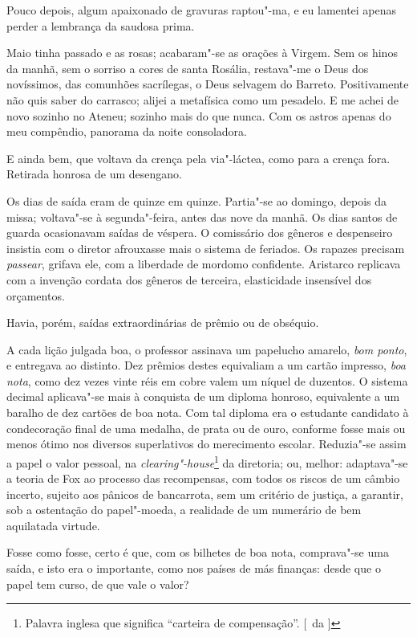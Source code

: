 Pouco depois, algum apaixonado de gravuras raptou"-ma, e eu lamentei
apenas perder a lembrança da saudosa prima. 

Maio tinha passado e as
rosas; acabaram"-se as orações à Virgem. Sem os hinos da manhã, sem o
sorriso a cores de santa Rosália, restava"-me o Deus dos novíssimos,
das comunhões sacrílegas, o Deus selvagem do Barreto. Positivamente não
quis saber do carrasco; alijei a metafísica como um pesadelo. E me
achei de novo sozinho no Ateneu; sozinho mais do que nunca. Com os
astros apenas do meu compêndio, panorama da noite consoladora. 

E ainda bem, que voltava da crença pela via"-láctea, como para a crença fora.
Retirada honrosa de um desengano. 

Os dias de saída eram de quinze em
quinze. Partia"-se ao domingo, depois da missa; voltava"-se à
segunda"-feira, antes das nove da manhã. Os dias santos de guarda
ocasionavam saídas de véspera. O comissário dos gêneros e despenseiro
insistia com o diretor afrouxasse mais o sistema de feriados. Os
rapazes precisam \textit{passear}, grifava ele, com a liberdade de mordomo
confidente. Aristarco replicava com a invenção cordata dos gêneros de
terceira, elasticidade insensível dos orçamentos. 

Havia, porém, saídas extraordinárias de prêmio ou de obséquio.

A cada lição julgada boa, o
professor assinava um papelucho amarelo, \textit{bom ponto}, e entregava ao
distinto. Dez prêmios destes equivaliam a um cartão impresso, \textit{boa nota},
como dez vezes vinte réis em cobre valem um níquel de duzentos. O
sistema decimal aplicava"-se mais à conquista de um diploma honroso,
equivalente a um baralho de dez cartões de boa nota. Com tal diploma
era o estudante candidato à condecoração final de uma medalha, de prata
ou de ouro, conforme fosse mais ou menos ótimo nos diversos
superlativos do merecimento escolar. Reduzia"-se assim a papel o valor
pessoal, na \textit{clearing"-house}\footnote{ Palavra inglesa que significa 
``carteira de compensação''. [~da ]} da diretoria; ou, melhor: adaptava"-se a
teoria de Fox ao processo das recompensas, com todos os riscos de um
câmbio incerto, sujeito aos pânicos de bancarrota, sem um critério de
justiça, a garantir, sob a ostentação do papel"-moeda, a realidade de
um numerário de bem aquilatada virtude. 

Fosse como fosse, certo é que,
com os bilhetes de boa nota, comprava"-se uma saída, e isto era o
importante, como nos países de más finanças: desde que o papel tem
curso, de que vale o valor? 

